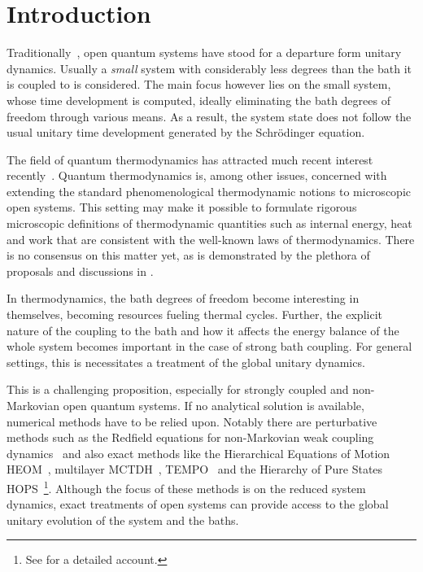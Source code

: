 \chapter{Introduction}%
\label{chap:intro}
Traditionally~\cite{Weiss2012,Rivas2012,Breuer2002Jun}, open quantum
systems have stood for a departure form unitary dynamics. Usually a
\emph{small} system with considerably less degrees than the bath it is
coupled to is considered. The main focus however lies on the small
system, whose time development is computed, ideally eliminating the
bath degrees of freedom through various means. As a result, the system
state does not follow the usual unitary time development generated by
the Schr\"odinger equation.

The field of quantum thermodynamics has attracted much recent interest
recently~\cite{Talkner2020Oct,Rivas2019Oct,Riechers2021Apr,Vinjanampathy2016Oct,Binder2018,Kurizki2021Dec,Mukherjee2020Jan,Xu2022Mar}.
Quantum thermodynamics is, among other issues, concerned with
extending the standard phenomenological thermodynamic notions to
microscopic open systems. This setting may make it possible to
formulate rigorous microscopic definitions of thermodynamic quantities
such as internal energy, heat and work that are consistent with the
well-known laws of thermodynamics. There is no consensus on this
matter yet, as is demonstrated by the plethora of proposals and
discussions in
\cite{Rivas2019Oct,Talkner2020Oct,Motz2018Nov,Wiedmann2020Mar,Senior2020Feb,Kato2015Aug,Kato2016Dec,Strasberg2021Aug,Talkner2016Aug,Bera2021Feb,Bera2021Jun,Esposito2015Dec}.

In thermodynamics, the bath degrees of freedom become interesting in
themselves, becoming resources fueling thermal cycles. Further, the
explicit nature of the coupling to the bath and how it affects the
energy balance of the whole system becomes important in the case of
strong bath coupling. For general settings, this is necessitates a
treatment of the global unitary dynamics.

This is a challenging proposition, especially for strongly coupled and
non-Markovian open quantum systems.  If no analytical solution is
available, numerical methods have to be relied upon. Notably there are
perturbative methods such as the Redfield equations for non-Markovian
weak coupling dynamics~\cite{Davidovic2020Sep} and also exact methods
like the Hierarchical Equations of Motion
HEOM~\cite{Tanimura1990Jun,Tang2015Dec}, multilayer
MCTDH~\cite{Wang2010May}, TEMPO~\cite{Strathearn2018Aug} and the
Hierarchy of Pure States HOPS~\cite{Suess2014Oct}\footnote{See
  \cite{RichardDiss} for a detailed account.}. Although the focus of
these methods is on the reduced system dynamics, exact treatments of
open systems can provide access to the global unitary evolution of the
system and the baths.

